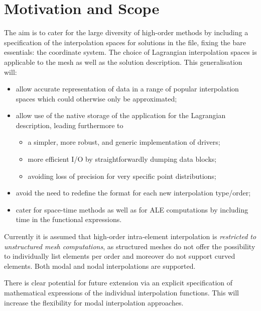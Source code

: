 \documentclass[11pt,letterpaper]{article}
\newenvironment{v2quote}
  {\begin{v2quoteframe}%
   \noindent{\footnotesize\sffamily\bfseries\color{cgnsblue}v2 text}%
   \nopagebreak\par\nopagebreak\vspace{0.15em}}
  {\end{v2quoteframe}}
\begin{document}
\newpage
\tableofcontents
\newpage

\section{Motivation and Scope}
\label{sec:motivation}

\begin{v2quote}
The aim is to cater for the large diversity of high-order methods by including a specification of
the interpolation spaces for solutions in the file, fixing the bare essentials: the coordinate
system.  The choice of Lagrangian interpolation spaces is applicable to the mesh as well as the
solution description.  This generalisation will:

\begin{itemize}[leftmargin=2em]
  \item allow accurate representation of data in a range of popular interpolation spaces which
    could otherwise only be approximated;
  \item allow use of the native storage of the application for the Lagrangian description, leading
    furthermore to
    \begin{itemize}
      \item a simpler, more robust, and generic implementation of drivers;
      \item more efficient I/O by straightforwardly dumping data blocks;
      \item avoiding loss of precision for very specific point distributions;
    \end{itemize}
  \item avoid the need to redefine the format for each new interpolation type/order;
  \item cater for space-time methods as well as for ALE computations by including time in the
    functional expressions.
\end{itemize}

Currently it is assumed that high-order intra-element interpolation is \emph{restricted to
unstructured mesh computations}, as structured meshes do not offer the possibility to
individually list elements per order and moreover do not support curved elements.  Both modal and
nodal interpolations are supported.

There is clear potential for future extension via an explicit specification of mathematical
expressions of the individual interpolation functions.  This will increase the flexibility for
modal interpolation approaches.
\end{v2quote}
\end{document}
